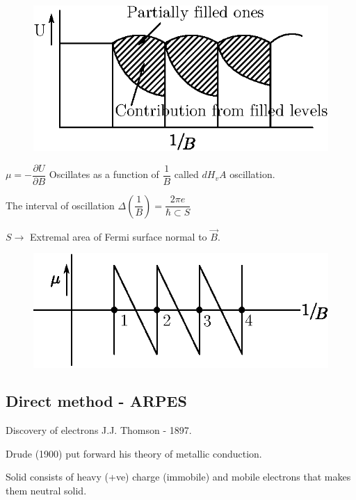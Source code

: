 \chapter[Lecture 25]{}\label{lec25}
\begin{figure}[H]
\centering
\includegraphics{images/lecture25/fig14.eps}
\end{figure}

$\mu=-\dfrac{\partial U}{\partial B}$ Oscillates as a function of $\dfrac{1}{B}$ called $dH_{v}A$ oscillation.

The interval of oscillation $\Delta\left(\dfrac{1}{B}\right)=\dfrac{2\pi e}{\hbar \subset S}$

$S\to$ Extremal area of Fermi surface normal to $\overrightarrow{B}$.
\begin{figure}[H]
\centering
\includegraphics{images/lecture25/fig15.eps}
\end{figure}

\section*{Direct method - ARPES}

Discovery of electrons J.J. Thomson - 1897.

Drude (1900) put forward his theory of metallic conduction.

Solid consists of heavy (+ve) charge (immobile) and mobile electrons that makes them neutral solid.

